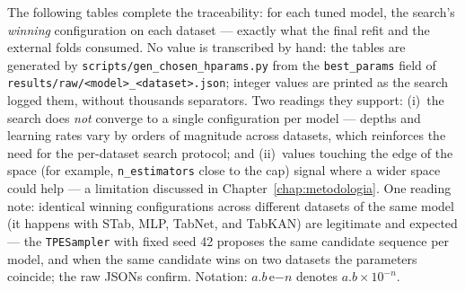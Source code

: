 The following tables complete the traceability: for each tuned model,
the search's \emph{winning} configuration on each dataset --- exactly
what the final refit and the external folds consumed. No value is
transcribed by hand: the tables are generated by
\texttt{scripts/\allowbreak gen\_\allowbreak chosen\_\allowbreak hparams.\allowbreak py}
from the \texttt{best\_params} field of
\texttt{results/\allowbreak raw/\allowbreak <model>\_\allowbreak <dataset>.\allowbreak json};
integer values are printed as the search logged them, without
thousands separators.
Two readings they support: (i)~the search does \emph{not} converge to
a single configuration per model --- depths and learning rates vary
by orders of magnitude across datasets, which reinforces the need for
the per-dataset search protocol; and (ii)~values touching the edge of
the space (for example, \texttt{n\_estimators} close to the cap)
signal where a wider space could help --- a limitation discussed in
Chapter~\ref{chap:metodologia}. One reading note: identical winning
configurations across different datasets of the same model (it
happens with STab, MLP, TabNet, and TabKAN) are legitimate and expected ---
the \texttt{TPESampler} with fixed seed 42 proposes the same candidate
sequence per model, and when the same candidate wins on two datasets
the parameters coincide; the raw JSONs confirm. Notation:
\mbox{$a.b\,$e$-n$} denotes $a.b \times 10^{-n}$.


